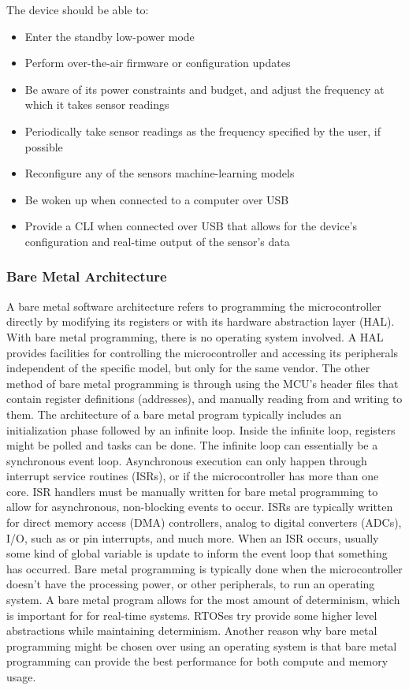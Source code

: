 The device should be able to:
\begin{itemize}
	\item Enter the standby low-power mode
	\item Perform over-the-air firmware or configuration updates
	\item Be aware of its power constraints and budget, and adjust the
		frequency at which it takes sensor readings
	\item Periodically take sensor readings as the frequency specified by the
		user, if possible
	\item Reconfigure any of the sensors machine-learning models
	\item Be woken up when connected to a computer over USB
	\item Provide a CLI when connected over USB that allows for the device's
		configuration and real-time output of the sensor's data
\end{itemize}

\subsubsection{Bare Metal Architecture}
A bare metal software architecture refers to programming the microcontroller
directly by modifying its registers or with its hardware abstraction layer
(HAL). With bare metal programming, there is no operating system involved. A
HAL provides facilities for controlling the microcontroller and accessing its
peripherals independent of the specific model, but only for the same vendor. The
other method of bare metal programming is through using the MCU's header files
that contain register definitions (addresses), and manually reading from and
writing to them. The architecture of a bare metal program typically includes an
initialization phase followed by an infinite loop. Inside the infinite loop,
registers might be polled and tasks can be done. The infinite loop can
essentially be a synchronous event loop. Asynchronous execution can only happen
through interrupt service routines (ISRs), or if the microcontroller has more
than one core. ISR handlers must be manually written for bare metal programming
to allow for asynchronous, non-blocking events to occur. ISRs are typically
written for direct memory access (DMA) controllers, analog to digital converters
(ADCs), I/O, such as \iic or pin interrupts, and much more. When an ISR occurs,
usually some kind of global variable is update to inform the event loop that
something has occurred. Bare metal programming is typically done when the
microcontroller doesn't have the processing power, or other peripherals, to run
an operating system. A bare metal program allows for the most amount of
determinism, which is important for for real-time systems. RTOSes try provide
some higher level abstractions while maintaining determinism. Another reason why
bare metal programming might be chosen over using an operating system is that
bare metal programming can provide the best performance for both compute and
memory usage.


